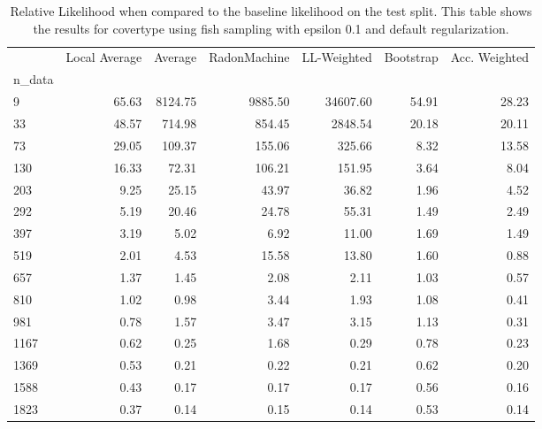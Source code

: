 \begin{table}
\centering
\caption{Relative Likelihood when compared to the baseline likelihood on the test split. This table shows the results for  covertype using  fish sampling with epsilon  0.1 and  default regularization.}
\label{tab:0}
\begin{tabular}{lrrrrrr}
\toprule
{} &  Local Average &  Average &  RadonMachine &  LL-Weighted &  Bootstrap &  Acc. Weighted \\
n\_data &                &          &               &              &            &                \\
\midrule
9      &          65.63 &  8124.75 &       9885.50 &     34607.60 &      54.91 &          28.23 \\
33     &          48.57 &   714.98 &        854.45 &      2848.54 &      20.18 &          20.11 \\
73     &          29.05 &   109.37 &        155.06 &       325.66 &       8.32 &          13.58 \\
130    &          16.33 &    72.31 &        106.21 &       151.95 &       3.64 &           8.04 \\
203    &           9.25 &    25.15 &         43.97 &        36.82 &       1.96 &           4.52 \\
292    &           5.19 &    20.46 &         24.78 &        55.31 &       1.49 &           2.49 \\
397    &           3.19 &     5.02 &          6.92 &        11.00 &       1.69 &           1.49 \\
519    &           2.01 &     4.53 &         15.58 &        13.80 &       1.60 &           0.88 \\
657    &           1.37 &     1.45 &          2.08 &         2.11 &       1.03 &           0.57 \\
810    &           1.02 &     0.98 &          3.44 &         1.93 &       1.08 &           0.41 \\
981    &           0.78 &     1.57 &          3.47 &         3.15 &       1.13 &           0.31 \\
1167   &           0.62 &     0.25 &          1.68 &         0.29 &       0.78 &           0.23 \\
1369   &           0.53 &     0.21 &          0.22 &         0.21 &       0.62 &           0.20 \\
1588   &           0.43 &     0.17 &          0.17 &         0.17 &       0.56 &           0.16 \\
1823   &           0.37 &     0.14 &          0.15 &         0.14 &       0.53 &           0.14 \\
\bottomrule
\end{tabular}
\end{table}
